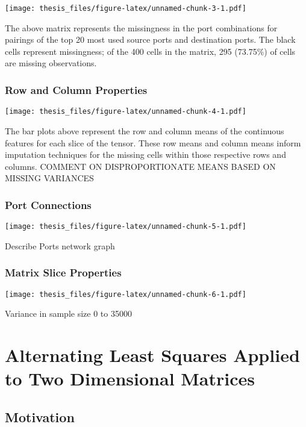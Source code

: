 \documentclass[12pt,twoside]{dukestatscithesis}
\theoremstyle{definition}
\theoremstyle{definition}
\theoremstyle{definition}
\theoremstyle{remark}
\begin{document}
\texttt{[image: thesis\_files/figure-latex/unnamed-chunk-3-1.pdf]}

The above matrix represents the missingness in the port combinations for
pairings of the top 20 most used source ports and destination ports. The
black cells represent missingness; of the 400 cells in the matrix, 295
(73.75\%) of cells are missing observations.

\subsection{Row and Column Properties}\label{row-and-column-properties}

\texttt{[image: thesis\_files/figure-latex/unnamed-chunk-4-1.pdf]}

The bar plots above represent the row and column means of the continuous
features for each slice of the tensor. These row means and column means
inform imputation techniques for the missing cells within those
respective rows and columns. COMMENT ON DISPROPORTIONATE MEANS BASED ON
MISSING VARIANCES

\subsection{Port Connections}\label{port-connections}

\texttt{[image: thesis\_files/figure-latex/unnamed-chunk-5-1.pdf]}

Describe Ports network graph

\subsection{Matrix Slice Properties}\label{matrix-slice-properties}

\texttt{[image: thesis\_files/figure-latex/unnamed-chunk-6-1.pdf]}

Variance in sample size 0 to 35000

\chapter{Alternating Least Squares Applied to Two Dimensional
Matrices}\label{alternating-least-squares-applied-to-two-dimensional-matrices}

\section{Motivation}\label{motivation-1}
\end{document}
